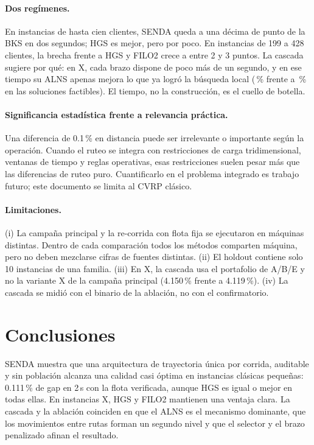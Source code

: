 \documentclass[11pt,a4paper]{article}
\newcommand{\senda}{SENDA}
\begin{document}
\paragraph{Dos regímenes.} En instancias de hasta cien clientes, \senda{} queda a una décima de punto
de la BKS en dos segundos; HGS es mejor, pero por poco. En instancias de 199 a 428 clientes, la
brecha frente a HGS y FILO2 crece a entre 2 y 3 puntos. La cascada sugiere por qué: en X, cada brazo
dispone de poco más de un segundo, y en ese tiempo su ALNS apenas mejora lo que ya logró la búsqueda
local (\cgfXd\,\% frente a \cgfXc\,\% en las soluciones factibles). El tiempo, no la construcción, es
el cuello de botella.

\paragraph{Significancia estadística frente a relevancia práctica.} Una diferencia de 0.1\,\% en
distancia puede ser irrelevante o importante según la operación. Cuando el ruteo se integra con
restricciones de carga tridimensional, ventanas de tiempo y reglas operativas, esas restricciones
suelen pesar más que las diferencias de ruteo puro. Cuantificarlo en el problema integrado es
trabajo futuro; este documento se limita al CVRP clásico.

\paragraph{Limitaciones.}
(i) La campaña principal y la re-corrida con flota fija se ejecutaron en máquinas distintas.
Dentro de cada comparación todos los métodos comparten máquina, pero no deben mezclarse cifras de
fuentes distintas.
(ii) El holdout contiene solo 10 instancias de una familia.
(iii) En X, la cascada usa el portafolio de A/B/E y no la variante X de la campaña principal
(4.150\,\% frente a 4.119\,\%).
(iv) La cascada se midió con el binario de la ablación, no con el confirmatorio.

\section{Conclusiones}
\label{sec:conclusiones}

\senda{} muestra que una arquitectura de trayectoria única por corrida, auditable y sin población alcanza una
calidad casi óptima en instancias clásicas pequeñas: 0.111\,\% de gap en 2\,s con la flota
verificada, aunque HGS es igual o mejor en todas ellas. En instancias X, HGS y FILO2 mantienen una
ventaja clara. La cascada y la ablación coinciden en que el ALNS es el mecanismo dominante, que los
movimientos entre rutas forman un segundo nivel y que el selector y el brazo penalizado afinan el
resultado.
\end{document}
